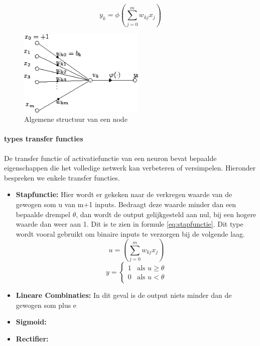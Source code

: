		
		\begin{equation}
			y_k = \phi \left( \sum_{j=0}^{m}w_{kj}x_j\right) 
		\end{equation}
		
		\begin{figure}
			\centering
			\includegraphics[width=60mm]{afbeeldingen/Artificial_neuron.PNG}
			\caption{Algemene structuur van een node}
			\label{fig:artificial_neuron}
		\end{figure}
		\paragraph{types transfer functies}
		De transfer functie of activatiefunctie van een neuron bevat bepaalde eigenschappen die het volledige netwerk kan verbeteren of versimpelen. Hieronder bespreken we enkele transfer functies.

		\begin{itemize}
			\item \textbf{Stapfunctie:} Hier wordt er gekeken naar de verkregen waarde van de gewogen som u van m+1 inputs. Bedraagt deze waarde minder dan een bepaalde drempel $\theta$, dan wordt de output gelijkgesteld aan nul, bij een hogere waarde dan weer aan 1. Dit is te zien in formule \ref{eq:stapfunctie}. Dit type wordt vooral gebruikt om binaire inputs te verzorgen bij de volgende laag. 
			\begin{equation}
				u =  \left( \sum_{j=0}^{m}w_{kj}x_j\right) 
			\end{equation}
			\begin{equation}\label{eq:stapfunctie}
			y={\begin{cases}1&{\text{als }}u\geq \theta
					   	\\0&{\text{als }}u<\theta \end{cases}}
			\end{equation}
			
			\item \textbf{Lineare Combinaties:} In dit geval is de output niets minder dan de gewogen som plus e
			\item \textbf{Sigmoid:}
			\item \textbf{Rectifier:}
		\end{itemize}
